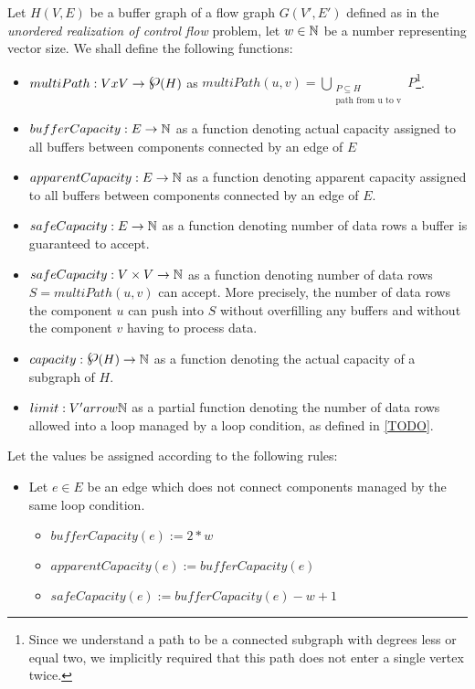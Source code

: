 \begin{define}
  Let $H(V,E)$ be a buffer graph of a flow graph $G(V',E')$ defined as in the \emph{unordered realization of control flow} problem, let $w \in \mathbb{N}$ be a number representing vector size. We shall define the following functions:
  \begin{itemize}
    \item $multiPath: V x V \arrow \powerset (H)$ as $multiPath(u,v) = \bigcup_{\substack{P \subseteq H \\ \text{path from u to v}}} P$\footnote{Since we understand a path to be a connected subgraph with degrees less or equal two, we implicitly required that this path does not enter a single vertex twice.}.
    \item $bufferCapacity: E \rightarrow \mathbb{N}$ as a function denoting actual capacity assigned to all buffers between components connected by an edge of $E$ 
    \item $apparentCapacity: E \rightarrow \mathbb{N}$ as a function denoting apparent capacity assigned to all buffers between components connected by an edge of $E$.
    \item $safeCapacity: E \rightarrow \mathbb{N}$ as a function denoting number of data rows a buffer is guaranteed to accept.
    \item $safeCapacity: V \times V \rightarrow \mathbb{N}$ as a function denoting number of data rows $S = multiPath(u,v)$ can accept. More precisely, the number of data rows the component $u$ can push into $S$ without overfilling any buffers and without the component $v$ having to process data.
    \item $capacity: \powerset(H) \arrow \N$ as a function denoting the actual capacity of a subgraph of $H$.
    \item $limit: V' arrow \mathbb{N}$ as a partial function denoting the number of data rows allowed into a loop managed by a loop condition, as defined in \ref{TODO}.
  \end{itemize}


  Let the values be assigned according to the following rules:
  \begin{itemize}
    \item Let $e \in E$ be an edge which does not connect components managed by the same loop condition.
    \begin{itemize}
      \item $bufferCapacity(e) := 2*w$ 
      \item $apparentCapacity(e) := bufferCapacity(e)$ 
      \item $safeCapacity(e) := bufferCapacity(e) - w + 1$ 
        

\end{itemize}
\end{itemize}
\end{define}
